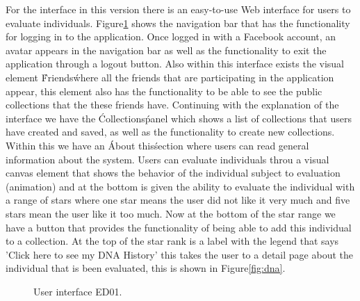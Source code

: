 For the interface in this version there is an easy-to-use Web interface for
users to evaluate  individuals. Figure\ref{fig:UI_01} shows the navigation
bar that has the functionality for logging in to the application.
Once logged in with a Facebook account, an avatar appears in the navigation bar
as well as the functionality to exit the application through a logout button. Also
within this interface exists the visual element \'Friends\' where all the friends
that are participating in the application appear, this element also has the
functionality to be able to see the public collections that the these friends have.
Continuing with the explanation of the interface we have the \'Collections\' panel
which shows a list of collections that users have created and saved, as well as
the functionality to create new collections. Within this we have
an \'About this\' section where users can read general information about the
system. Users can evaluate individuals throu a
visual canvas element that shows the behavior of the individual subject to
evaluation (animation) and at the bottom is given the ability to evaluate the
individual with a range of stars where one star means the user did not like it
very much and five stars mean the user like it too much. Now at the bottom of
the star range we have a button that provides the functionality of being able to
add this individual to a collection. At
the top of the star rank is a label with the legend that says 'Click here to
see my DNA History' this takes the user to a detail page about the individual that is
been evaluated, this is shown
in Figure\ref{fig:dna}.

\begin{figure}
\captionsetup{justification=centering,margin=2cm}
\centering
\setlength\fboxsep{0pt}
\setlength\fboxrule{0.7pt}
\caption{User interface ED01.}
\label{fig:UI_01}
\end{figure}

